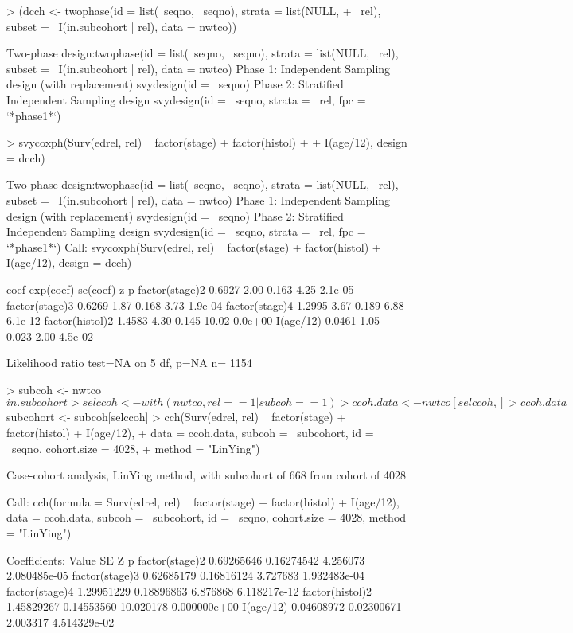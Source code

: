 \documentclass{article}
\begin{document}
\begin{Schunk}
\begin{Sinput}
> (dcch <- twophase(id = list(~seqno, ~seqno), strata = list(NULL, 
+     ~rel), subset = ~I(in.subcohort | rel), data = nwtco))
\end{Sinput}
\begin{Soutput}
Two-phase design:twophase(id = list(~seqno, ~seqno), strata = list(NULL, ~rel), 
    subset = ~I(in.subcohort | rel), data = nwtco)
Phase 1:
Independent Sampling design (with replacement)
svydesign(id = ~seqno)
Phase 2:
Stratified Independent Sampling design
svydesign(id = ~seqno, strata = ~rel, fpc = `*phase1*`)
\end{Soutput}
\begin{Sinput}
> svycoxph(Surv(edrel, rel) ~ factor(stage) + factor(histol) + 
+     I(age/12), design = dcch)
\end{Sinput}
\begin{Soutput}
Two-phase design:twophase(id = list(~seqno, ~seqno), strata = list(NULL, ~rel), 
    subset = ~I(in.subcohort | rel), data = nwtco)
Phase 1:
Independent Sampling design (with replacement)
svydesign(id = ~seqno)
Phase 2:
Stratified Independent Sampling design
svydesign(id = ~seqno, strata = ~rel, fpc = `*phase1*`)
Call:
svycoxph(Surv(edrel, rel) ~ factor(stage) + factor(histol) + 
    I(age/12), design = dcch)


                  coef exp(coef) se(coef)     z       p
factor(stage)2  0.6927      2.00    0.163  4.25 2.1e-05
factor(stage)3  0.6269      1.87    0.168  3.73 1.9e-04
factor(stage)4  1.2995      3.67    0.189  6.88 6.1e-12
factor(histol)2 1.4583      4.30    0.145 10.02 0.0e+00
I(age/12)       0.0461      1.05    0.023  2.00 4.5e-02

Likelihood ratio test=NA  on 5 df, p=NA  n= 1154 
\end{Soutput}
\begin{Sinput}
> subcoh <- nwtco$in.subcohort
> selccoh <- with(nwtco, rel == 1 | subcoh == 1)
> ccoh.data <- nwtco[selccoh, ]
> ccoh.data$subcohort <- subcoh[selccoh]
> cch(Surv(edrel, rel) ~ factor(stage) + factor(histol) + I(age/12), 
+     data = ccoh.data, subcoh = ~subcohort, id = ~seqno, cohort.size = 4028, 
+     method = "LinYing")
\end{Sinput}
\begin{Soutput}
Case-cohort analysis,  LinYing  method,
 with subcohort of 668 from cohort of 4028 

Call: cch(formula = Surv(edrel, rel) ~ factor(stage) + factor(histol) + 
    I(age/12), data = ccoh.data, subcoh = ~subcohort, id = ~seqno, 
    cohort.size = 4028, method = "LinYing")

Coefficients:
                     Value         SE         Z            p
factor(stage)2  0.69265646 0.16274542  4.256073 2.080485e-05
factor(stage)3  0.62685179 0.16816124  3.727683 1.932483e-04
factor(stage)4  1.29951229 0.18896863  6.876868 6.118217e-12
factor(histol)2 1.45829267 0.14553560 10.020178 0.000000e+00
I(age/12)       0.04608972 0.02300671  2.003317 4.514329e-02
\end{Soutput}
\end{Schunk}
\end{document}
